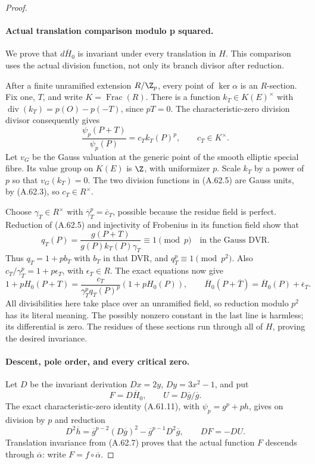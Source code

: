 \begin{proof}
\paragraph{Actual translation comparison modulo p squared.}
We prove that \(d\overline H_0\) is invariant under
every translation in \(H\). This comparison uses the
actual division function, not only its branch divisor
after reduction.

After a finite unramified extension \(R/\Z_p\), every
point of \(\ker\alpha\) is an \(R\)-section. Fix one,
\(T\), and write \(K=\operatorname{Frac}(R)\).
There is a function \(k_T\in K(E)^\times\) with
\(\operatorname{div}(k_T)=p(O)-p(-T)\), since \(pT=0\).
The characteristic-zero division divisor consequently gives
\[
 \frac{\psi_p(P+T)}{\psi_p(P)}=c_T k_T(P)^p,
                         \qquad c_T\in K^\times.
                                                        \tag{A.62.5}
\]
Let \(v_G\) be the Gauss valuation at the generic point
of the smooth elliptic special fibre. Its value group
on \(K(E)\) is \(\Z\), with uniformizer \(p\).
Scale \(k_T\) by a power of \(p\) so that \(v_G(k_T)=0\).
The two division functions in (A.62.5) are Gauss units,
by (A.62.3), so \(c_T\in R^\times\).

Choose \(\gamma_T\in R^\times\) with
\(\overline\gamma_T^p=\overline c_T\), possible
because the residue field is perfect. Reduction of
(A.62.5) and injectivity of Frobenius in its function
field show that
\[
 q_T(P)=\frac{g(P+T)}{g(P)k_T(P)\gamma_T}
                  \equiv1\pmod p
                       \quad\text{in the Gauss DVR}.
                                                        \tag{A.62.6}
\]
Thus \(q_T=1+pb_T\) with \(b_T\) in that DVR, and
\(q_T^p\equiv1\pmod{p^2}\). Also
\(c_T/\gamma_T^p=1+p\epsilon_T\), with
\(\epsilon_T\in R\). The exact equations now give
\[
 1+pH_0(P+T)
   =\frac{c_T}{\gamma_T^p q_T(P)^p}(1+pH_0(P)),
 \qquad
 \overline H_0(P+\overline T)
          =\overline H_0(P)+\overline\epsilon_T.
                                                        \tag{A.62.7}
\]
All divisibilities here take place over an unramified
field, so reduction modulo \(p^2\) has its literal
meaning. The possibly nonzero constant in the last
line is harmless; its differential is zero.
The residues of these sections run through all of
\(H\), proving the desired invariance.

\paragraph{Descent, pole order, and every critical zero.}
Let \(D\) be the invariant derivation
\(Dx=2y\), \(Dy=3x^2-1\), and put
\[
        F=D\overline H_0,
        \qquad U=D\overline g/\overline g.
                                                        \tag{A.62.8}
\]
The exact characteristic-zero identity (A.61.11), with
\(\psi_p=g^p+ph\), gives on division by \(p\) and
reduction
\[
 D^2\overline h
   =\overline g^{p-2}(D\overline g)^2
      -\overline g^{p-1}D^2\overline g,
                \qquad DF=-DU.                       \tag{A.62.9}
\]
Translation invariance from (A.62.7) proves that the
actual function \(F\) descends through
\(\overline\alpha\): write \(F=f\circ\overline\alpha\).


\end{proof}
